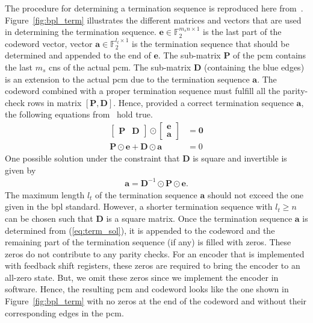 The procedure for determining a termination sequence is reproduced here from~\cite{Chen2006}. Figure~\ref{fig:bpl_term} illustrates the different matrices and vectors that are used in determining the termination sequence. $\mathbf{e}\in\mathbb{F}_2^{m_sn\times 1}$ is the last part of the codeword vector, vector $\mathbf{a}\in\mathbb{F}_2^{l_t\times 1}$ is the termination sequence that should be determined and appended to the end of $\mathbf{e}$. The sub-matrix $\mathbf{P}$ of the \gls{pcm} contains the last $m_s$ \glspl{cn} of the actual \gls{pcm}. The sub-matrix $\mathbf{D}$ (containing the blue edges) is an extension to the actual \gls{pcm} due to the termination sequence $\mathbf{a}$. The codeword combined with a proper termination sequence must fulfill all the parity-check rows in matrix $[\mathbf{P},\mathbf{D}]$. Hence, provided a correct termination sequence $\mathbf{a}$, the following equations from~\cite{Chen2006} hold true.
\begin{align}
\begin{bmatrix}\mathbf{P} &\mathbf{D}\end{bmatrix}\odot
\begin{bmatrix}
\mathbf{e}\\
\mathbf{a}
\end{bmatrix}&=\mathbf{0}\\
\mathbf{P}\odot\mathbf{e}+\mathbf{D}\odot\mathbf{a}&=0
\end{align}
One possible solution under the constraint that $\mathbf{D}$ is square and invertible is given by
\begin{align}\label{eq:term_sol}
\mathbf{a}=\mathbf{D}^{-1}\odot\mathbf{P}\odot\mathbf{e}.
\end{align}
The maximum length $l_t$ of the termination sequence $\mathbf{a}$ should not exceed the one given in the \gls{bpl} standard. However, a shorter termination sequence with $l_t\geq n$ can be chosen such that $\mathbf{D}$ is a square matrix. Once the termination sequence $\mathbf{a}$ is determined from (\ref{eq:term_sol}), it is appended to the codeword and the remaining part of the termination sequence (if any) is filled with zeros. These zeros do not contribute to any parity checks. For an encoder that is implemented with feedback shift registers, these zeros are required to bring the encoder to an all-zero state. But, we omit these zeros since we implement the encoder in software. Hence, the resulting \gls{pcm} and codeword looks like the one shown in Figure~\ref{fig:bpl_term} with no zeros at the end of the codeword and without their corresponding edges in the \gls{pcm}.

